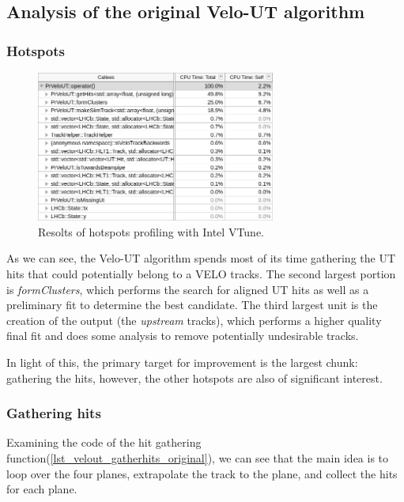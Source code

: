 \documentclass[12pt]{article}
\begin{document}
\subsection{Analysis of the original Velo-UT algorithm}

\subsubsection{Hotspots}

\begin{figure}[H]
	\begin{center}
		\includegraphics[width=0.7\textwidth]{velout_hotspots_orig}
	\end{center}
	\caption{Resolts of hotspots profiling with Intel VTune.}
	\label{fig_velout_hotspots_orig}
\end{figure}

As we can see, the Velo-UT algorithm spends most of its time gathering the UT hits that could potentially belong to a VELO tracks. The second largest portion is \textit{formClusters}, which performs the search for aligned UT hits as well as a preliminary fit to determine the best candidate. The third largest unit is the creation of the output (the \textit{upstream} tracks), which performs a higher quality final fit and does some analysis to remove potentially undesirable tracks.

In light of this, the primary target for improvement is the largest chunk: gathering the hits, however, the other hotspots are also of significant interest.


\subsubsection{Gathering hits}

Examining the code of the hit gathering function(\ref{lst_velout_gatherhits_original}), we can see that the main idea is to loop over the four planes, extrapolate the track to the plane, and collect the hits for each plane.
\end{document}
